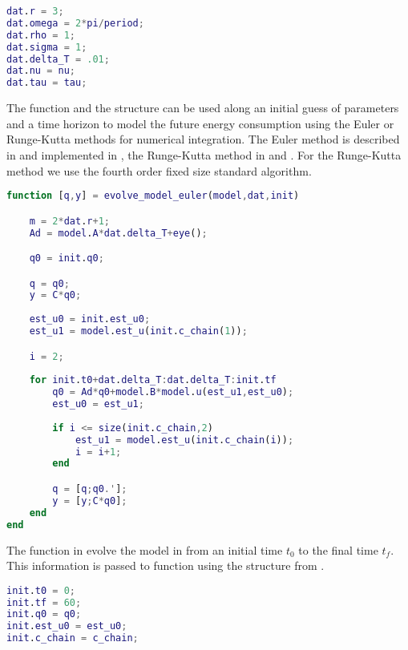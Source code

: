 \begin{lstlisting}[language=Matlab,caption={[Struct used to build the model]Struct \stt{dat} used by function \stt{build\_model} to build the model.},captionpos=b,label=lst:struct_dat]
dat.r = 3;
dat.omega = 2*pi/period;
dat.rho = 1;
dat.sigma = 1;
dat.delta_T = .01;
dat.nu = nu;
dat.tau = tau;
\end{lstlisting}

The function  and the structure  can be used along an initial guess of parameters and a time horizon to model the future energy consumption using the Euler or Runge-Kutta methods for numerical integration. The Euler method is described in  and implemented in , the Runge-Kutta method in  and . For the Runge-Kutta method we use the fourth order fixed size standard algorithm. 

\begin{lstlisting}[language=Matlab,caption={[Euler method for numerical integration]Euler method for numerical integration of the model.},captionpos=b,label=lst:euler]
function [q,y] = evolve_model_euler(model,dat,init)

    m = 2*dat.r+1;
    Ad = model.A*dat.delta_T+eye();

    q0 = init.q0;

    q = q0;
    y = C*q0;
    
    est_u0 = init.est_u0;
    est_u1 = model.est_u(init.c_chain(1));

    i = 2;
    
    for init.t0+dat.delta_T:dat.delta_T:init.tf
        q0 = Ad*q0+model.B*model.u(est_u1,est_u0);
        est_u0 = est_u1;
        
        if i <= size(init.c_chain,2)
            est_u1 = model.est_u(init.c_chain(i));
            i = i+1;
        end

        q = [q;q0.'];
        y = [y;C*q0];
    end
end
\end{lstlisting}

The function  in  evolve the model in  from an initial time $t_0$ to the final time $t_f$. This information is passed to function using the structure  from .

\begin{lstlisting}[language=Matlab,caption={[Structure \stt{init} with numerical integrator's initializations]Structure \stt{init} with numerical integrator's initializations.},captionpos=b,label=lst:init]
init.t0 = 0;
init.tf = 60;
init.q0 = q0;
init.est_u0 = est_u0;
init.c_chain = c_chain;
\end{lstlisting}

